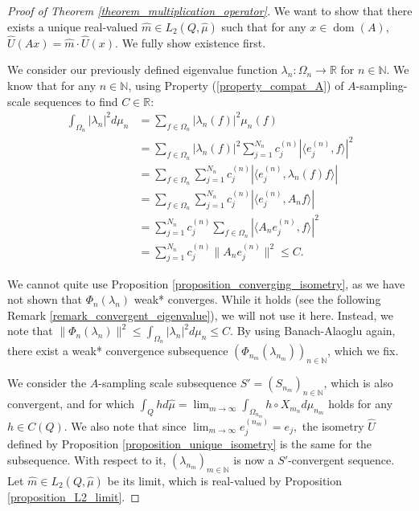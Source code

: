 \documentclass{amsart}
\theoremstyle{definition}
\theoremstyle{remark}
\def \Dom{\operatorname{dom}}
\def \HMU{\hat{\mu}}
\def \HU{\hat{U}}
\def \Hm{\hat{m}}
\def \LL{\langle}
\def \RR{\rangle}
\begin{document}
\begin{proof}[Proof of Theorem \ref{theorem_multiplication_operator}]
	We want to show that there exists a unique real-valued $\Hm\in L_2(Q,\HMU)$ such that for any $x\in\Dom(A)$, $\HU(Ax)=\Hm\cdot\HU(x).$ We fully show existence first. 
	
	We consider our previously defined eigenvalue function $\lambda_n:\Omega_n\rightarrow\mathbb{R}$ for $n\in\mathbb{N}$. We know that for any $n\in\mathbb{N}$, using Property (\ref{property_compat_A}) of $A$-sampling-scale sequences to find $C\in\mathbb{R}$:
	\begin{align*}
		\int_{\Omega_n}|\lambda_n|^2d\mu_n&=\sum_{f\in\Omega_n}|\lambda_n(f)|^2\mu_n(f)\\
		&=\sum_{f\in\Omega_n}|\lambda_n(f)|^2\sum_{j=1}^{N_n}c_j^{(n)}|\LL e_j^{(n)},f\RR|^2\\
		&=\sum_{f\in\Omega_n}\sum_{j=1}^{N_n}c_j^{(n)}|\LL e_j^{(n)},\lambda_n(f)f\RR|\\
		&=\sum_{f\in\Omega_n}\sum_{j=1}^{N_n}c_j^{(n)}|\LL e_j^{(n)},A_nf\RR|\\
		&=\sum_{j=1}^{N_n}c_j^{(n)}\sum_{f\in\Omega_n}|\LL A_n e_j^{(n)}, f\RR|^2\\
		&=\sum_{j=1}^{N_n}c_j^{(n)}\|A_ne_j^{(n)}\|^2\leq C.
	\end{align*}
	
	We cannot quite use Proposition \ref{proposition_converging_isometry}, as we have not shown that $\Phi_n(\lambda_n)$ weak* converges. While it holds (see the following Remark \ref{remark_convergent_eigenvalue}), we will not use it here. Instead, we note that $\|\Phi_n(\lambda_n)\|^2\leq\int_{\Omega_n}|\lambda_n|^2d\mu_n\leq C$. By using Banach-Alaoglu again, there exist a weak* convergence subsequence $(\Phi_{n_m}(\lambda_{n_m}))_{n\in\mathbb{N}}$, which we fix.
	
	We consider the $A$-sampling scale subsequence $S'=(S_{n_m})_{n\in\mathbb{N}}$, which is also convergent, and for which $\int_{Q} hd\HMU=\lim_{m\rightarrow\infty}\int_{\Omega_{n_m}}h\circ X_{m_n}d\mu_{n_m}$ holds for any $h\in C(Q)$. We also note that since $\lim_{m\rightarrow\infty}e_j^{(n_m)}=e_j,$ the isometry $\HU$ defined by Proposition \ref{proposition_unique_isometry} is the same for the subsequence.  With respect to it, $(\lambda_{n_m})_{m\in\mathbb{N}}$ is now a $S'$-convergent sequence. Let $\hat{m}\in L_2(Q,\HMU)$ be its limit, which is real-valued by Proposition \ref{proposition_L2_limit}. 
	

\end{proof}
\end{document}
